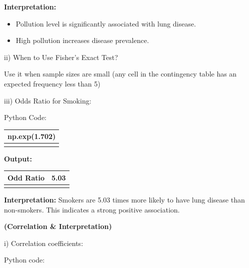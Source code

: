 \documentclass[
]{article}
\newcounter{none} %
\begin{document}
\textbf{Interpretation:}

\begin{itemize}
\item
  Pollution level is significantly associated with lung disease.
\item
  High pollution increases disease prevalence.
\end{itemize}

ii) When to Use Fisher's Exact Test?

Use it when sample sizes are small (any cell in the contingency table
has an expected frequency less than 5)

iii) Odds Ratio for Smoking:

Python Code:

{\def\LTcaptype{none} %
\begin{longtable}[]{@{}
  >{\raggedright\arraybackslash}p{}@{}}
\toprule\noalign{}
\begin{minipage}[b]{\linewidth}\raggedright
np.exp(1.702)
\end{minipage} \\
\midrule\noalign{}
\endhead
\bottomrule\noalign{}
\endlastfoot
\end{longtable}
}

\textbf{Output:}

{\def\LTcaptype{none} %
\begin{longtable}[]{@{}
  >{\raggedright\arraybackslash}p{}
  >{\raggedright\arraybackslash}p{}@{}}
\toprule\noalign{}
\begin{minipage}[b]{\linewidth}\raggedright
Odd Ratio
\end{minipage} & \begin{minipage}[b]{\linewidth}\raggedright
5.03
\end{minipage} \\
\midrule\noalign{}
\endhead
\bottomrule\noalign{}
\endlastfoot
\end{longtable}
}

\textbf{Interpretation:} Smokers are 5.03 times more likely to have lung
disease than non-smokers. This indicates a strong positive association.

\textbf{(Correlation \& Interpretation)}

i) Correlation coefficients:

Python code:
\end{document}
